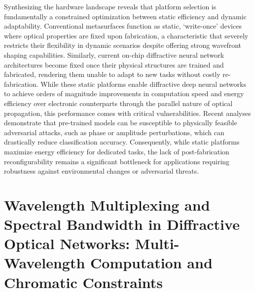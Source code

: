 Synthesizing the hardware landscape reveals that platform selection is fundamentally a constrained optimization between static efficiency and dynamic adaptability. Conventional metasurfaces function as static, `write-once' devices where optical properties are fixed upon fabrication, a characteristic that severely restricts their flexibility in dynamic scenarios despite offering strong wavefront shaping capabilities. Similarly, current on-chip diffractive neural network architectures become fixed once their physical structures are trained and fabricated, rendering them unable to adapt to new tasks without costly re-fabrication. While these static platforms enable diffractive deep neural networks to achieve orders of magnitude improvements in computation speed and energy efficiency over electronic counterparts through the parallel nature of optical propagation, this performance comes with critical vulnerabilities. Recent analyses demonstrate that pre-trained models can be susceptible to physically feasible adversarial attacks, such as phase or amplitude perturbations, which can drastically reduce classification accuracy. Consequently, while static platforms maximize energy efficiency for dedicated tasks, the lack of post-fabrication reconfigurability remains a significant bottleneck for applications requiring robustness against environmental changes or adversarial threats. \citep{doi_10_1002_nap2_70185_56c8ab30} \citep{doi_10_1117_12_3109287_f4650a31} \citep{doi_10_1109_dac18074_2021_9586204_0c48190f}

\section{Wavelength Multiplexing and Spectral Bandwidth in Diffractive Optical Networks: Multi-Wavelength Computation and Chromatic Constraints}\label{wavelength-multiplexing-and-spectral-bandwidth-in-diffractive-optical-networks-multi-wavelength-computation-and-chromatic-constraints}


